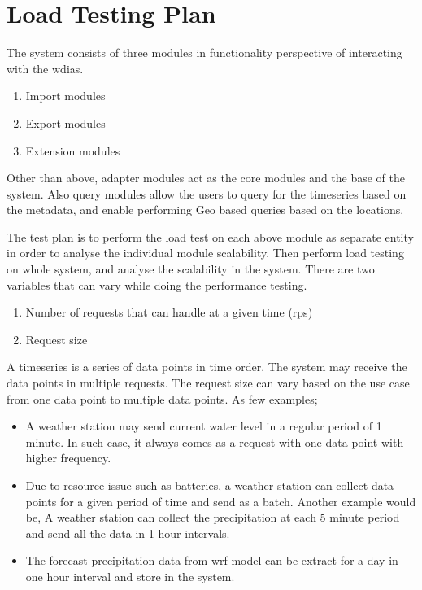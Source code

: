\section{Load Testing Plan}

The system consists of three modules in functionality perspective of interacting with the \acrshort{wdias}.
\begin{enumerate}
    \item Import modules
    \item Export modules
    \item Extension modules
\end{enumerate}
Other than above, adapter modules act as the core modules and the base of the system. Also query modules allow the users to query for the timeseries
based on the metadata, and enable performing Geo based queries based on the locations.

The test plan is to perform the load test on each above module as separate entity in order to analyse the individual module scalability.
Then perform load testing on whole system, and analyse the scalability in the system. There are two variables that can vary while doing the performance testing.
\begin{enumerate}
    \item Number of requests that can handle at a given time (\acrfull{rps})
    \item Request size
\end{enumerate}
A timeseries is a series of data points in time order. The system may receive the data points in multiple requests.
The request size can vary based on the use case from one data point to multiple data points. As few examples;
\begin{itemize}
    \item A weather station may send current water level in a regular period of 1 minute. In such case, it always comes as a request with one data point with higher frequency.
    \item Due to resource issue such as batteries, a weather station can collect data points for a given period of time and send as a batch. Another example would be,
A weather station can collect the precipitation at each 5 minute period and send all the data in 1 hour intervals.
    \item The forecast precipitation data from \acrshort{wrf} model can be extract for a day in one hour interval and store in the system.
\end{itemize}

